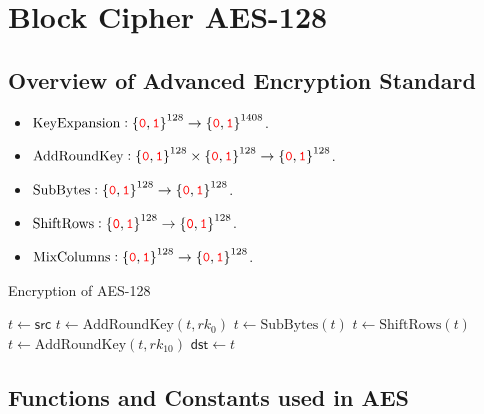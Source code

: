 \chapter{Block Cipher AES-128}

\section{Overview of Advanced Encryption Standard}

\begin{itemize}
	\item $\text{KeyExpansion}:\binaryfield^{128}\to\binaryfield^{1408}$.
	\item $\text{AddRoundKey}:\binaryfield^{128}\times\binaryfield^{128}\to\binaryfield^{128}$.
	\item $\text{SubBytes}:\binaryfield^{128}\to\binaryfield^{128}$.
	\item $\text{ShiftRows}:\binaryfield^{128}\to\binaryfield^{128}$.
	\item $\text{MixColumns}:\binaryfield^{128}\to\binaryfield^{128}$.
\end{itemize}

\begin{algorithm}[H]
	\caption{Encryption of AES-128}
	
	\BlankLine
	$t \leftarrow \mathsf{src}$\;
	$t \leftarrow \text{AddRoundKey}(t, rk_0)$\;
	$t \leftarrow \text{SubBytes}(t)$\;
	$t \leftarrow \text{ShiftRows}(t)$\;
	$t \leftarrow \text{AddRoundKey}(t, rk_{10})$\;
	$\mathsf{dst} \leftarrow t$\;
	\;
\end{algorithm}

\newpage
\section{Functions and Constants used in AES}

